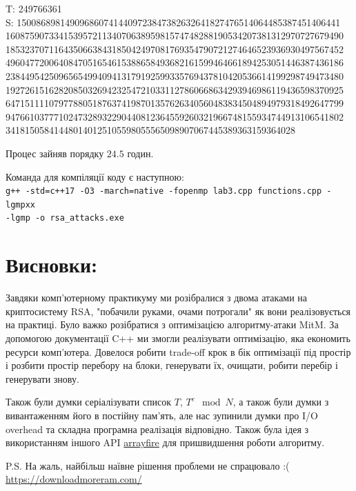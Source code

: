\noindent T: 249766361 \\
S: 1500868981490968607414409723847382632641827476514064485387451406441  \\
1608759073341539572113407063895981574748288190534207381312970727679490  \\
1853237071164350663843185042497081769354790721274646523936930497567452  \\
4960477200640847051654615388658493682161599464661894253051446387436186  \\
2384495425096565499409413179192599335769437810420536614199298749473480  \\
1927261516282085032694232547210331127860668634293946986119436598370925  \\
6471511110797788051876374198701357626340560483834504894979318492647799  \\
9476610377710247328932290440812364559260321966748155934744913106541802  \\
341815058414480140125105598055565098907067445389363159364028

\noindent Процес зайняв порядку $24.5$ годин. 

\noindent Команда для компіляції коду є наступною: \\
\texttt{g++ -std=c++17 -O3 -march=native -fopenmp lab3.cpp functions.cpp -lgmpxx \\ -lgmp -o rsa\_attacks.exe}

\section{Висновки:}
Завдяки комп'ютерному практикуму ми розібралися з двома атаками на криптосистему RSA, "побачили руками, очами потрогали"{} 
як вони реалізовується на практиці. Було важко розібратися з оптимізацією алгоритму-атаки MitM. За допомогою документації 
C++ ми змогли реалізувати оптимізацію, яка економить ресурси комп'ютера. Довелося робити trade-off крок в бік оптимізації 
під простір і розбити простір перебору на блоки, генерувати їх, очищати, робити перебір і генерувати знову.

Також були думки серіалізувати список $T$, $T^{e} \mod N$, а також були думки з вивантаженням його в постійну пам'ять, 
але нас зупинили думки про I/O overhead та складна програмна реалізація відповідно. Також була ідея з використанням 
іншого API \href{https://arrayfire.org/docs/gettingstarted.htm}{arrayfire} для пришвидшення роботи алгоритму. 

\noindent P.S. На жаль, найбільш наївне рішення проблеми не спрацювало :( \\
\url{https://downloadmoreram.com/}

